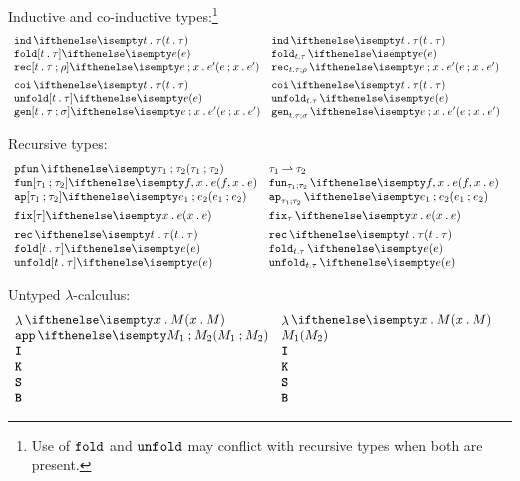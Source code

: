 \documentclass[11pt,twoside]{article}
\begin{document}
Inductive and co-inductive types:\footnote{Use of $\Opn{fold}$ and $\Opn{unfold}$ may conflict with recursive types when both are present.}
\begin{displaymath}
  \begin{array}{l@{\quad}l@{\quad}l}
    \indty{t}{\tau} & \indty*{t}{\tau} \\
    \foldex[t][\tau]{e} & \foldex*{e} \\
    \recex[t][\tau][\rho]{e}{x}{e'} & \recex*{e}{x}{e'} \\[1ex]
    \coity{t}{\tau} & \coity*{t}{\tau} \\
    \unfoldex[t][\tau]{e} & \unfoldex*{e} \\
    \genex[t][\tau][\sigma]{e}{x}{e'} & \genex*{e}{x}{e'}
  \end{array}
\end{displaymath}

Recursive types:
\begin{displaymath}
  \begin{array}{l@{\quad}l@{\quad}l}

    \parrty{\tau_1}{\tau_2} & \parrty*{\tau_1}{\tau_2} \\
    \funex{f}{x}{e} & \funex*{f}{x}{e} \\
    \appex{e_1}{e_2} & \appex*{e_1}{e_2} \\[1ex]

    \fixex[\tau]{x}{e} & \fixex*[\tau]{x}{e}  \\[1ex]

    \recty{t}{\tau} & \recty*{t}{\tau} \\
    \foldex[t][\tau]{e}  & \foldex*{e} \\
    \unfoldex[t][\tau]{e} & \unfoldex*{e}
  \end{array}
\end{displaymath}

Untyped $\lambda$-calculus:
\begin{displaymath}
  \begin{array}{l@{\quad}l@{\quad}l}
    \ulamex{x}{M} & \ulamex*{x}{M} \\
    \uapex{M_1}{M_2} & \uapex*{M_1}{M_2} \\
    \uIex & \uIex* \\
    \uKex & \uKex* \\
    \uSex & \uSex& \\
    \uBex & \uBex*
  \end{array}
\end{displaymath}
\end{document}
